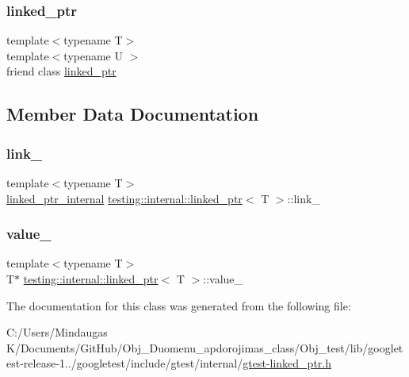 \subsubsection{\texorpdfstring{linked\_ptr}{linked\_ptr}}
{\footnotesize\ttfamily template$<$typename T$>$ \\
template$<$typename U $>$ \\
friend class \mbox{\hyperlink{classtesting_1_1internal_1_1linked__ptr}{linked\+\_\+ptr}}\hspace{0.3cm}{\ttfamily [friend]}}



\subsection{Member Data Documentation}
\mbox{\label{classtesting_1_1internal_1_1linked__ptr_a8fdfa75fea8bfc10825a3cc53c50461f}} 
\subsubsection{\texorpdfstring{link\_}{link\_}}
{\footnotesize\ttfamily template$<$typename T$>$ \\
\mbox{\hyperlink{classtesting_1_1internal_1_1linked__ptr__internal}{linked\+\_\+ptr\+\_\+internal}} \mbox{\hyperlink{classtesting_1_1internal_1_1linked__ptr}{testing\+::internal\+::linked\+\_\+ptr}}$<$ T $>$\+::link\+\_\+\hspace{0.3cm}{\ttfamily [private]}}

\mbox{\label{classtesting_1_1internal_1_1linked__ptr_abb52c4e944fc7a24a4ec7788b612fb37}} 
\subsubsection{\texorpdfstring{value\_}{value\_}}
{\footnotesize\ttfamily template$<$typename T$>$ \\
T$\ast$ \mbox{\hyperlink{classtesting_1_1internal_1_1linked__ptr}{testing\+::internal\+::linked\+\_\+ptr}}$<$ T $>$\+::value\+\_\+\hspace{0.3cm}{\ttfamily [private]}}



The documentation for this class was generated from the following file\+:\begin{DoxyCompactItemize}
\item 
C\+:/\+Users/\+Mindaugas K/\+Documents/\+Git\+Hub/\+Obj\+\_\+\+Duomenu\+\_\+apdorojimas\+\_\+class/\+Obj\+\_\+test/lib/googletest-\/release-\/1../googletest/include/gtest/internal/\mbox{\hyperlink{gtest-linked__ptr_8h}{gtest-\/linked\+\_\+ptr.\+h}}\end{DoxyCompactItemize}
